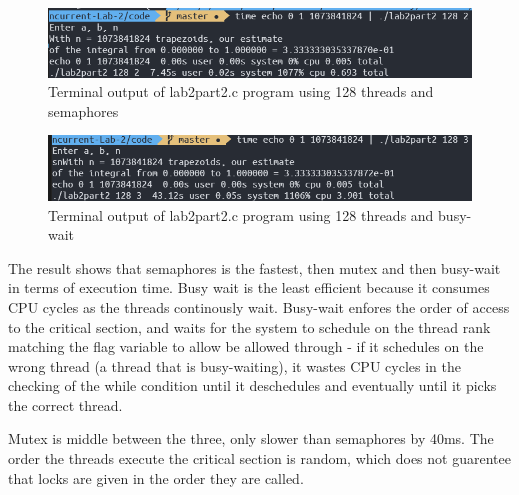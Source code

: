 \begin{figure}[ht]
	\centering
	\includegraphics[width=\textwidth]{Figures/part2_128_2.PNG}
	\caption{Terminal output of lab2part2.c program using 128 threads and semaphores}
	\label{fig:part2_128_1}
\end{figure}

\begin{figure}[ht]
	\centering
	\includegraphics[width=\textwidth]{Figures/part2_128_3.PNG}
	\caption{Terminal output of lab2part2.c program using 128 threads and busy-wait}
	\label{fig:part2_128_2}
\end{figure}

The result shows that semaphores is the fastest, then mutex and then busy-wait in terms of execution time.
Busy wait is the least efficient because it consumes CPU cycles as the threads continously wait. Busy-wait
enfores the order of access to the critical section, and waits for the system to schedule on the thread
rank matching the flag variable to allow be allowed through - if it schedules on the wrong thread (a thread
that is busy-waiting), it wastes CPU cycles in the checking of the while condition until it deschedules and 
eventually until it picks the correct thread.

Mutex is middle between the three, only slower than semaphores by 40ms. The order the threads execute
the critical section is random, which does not guarentee that locks are given in the order they are called.